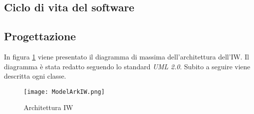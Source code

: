\subsection{Ciclo di vita del software}
\label{sec:ciclo-vita-software}

\subsection{Progettazione}
\label{sec:progettazione}
In figura \ref{fig:ark-mod-iw} viene presentato il diagramma di massima dell’architettura dell’IW. Il diagramma è stata redatto seguendo lo standard \emph{UML 2.0}. Subito a seguire viene descritta ogni classe.
\begin{figure}[htbp]
    
    \centering
    \texttt{[image: ModelArkIW.png]} 
    \caption{Architettura IW}
    \label{fig:ark-mod-iw} 
\end{figure}

